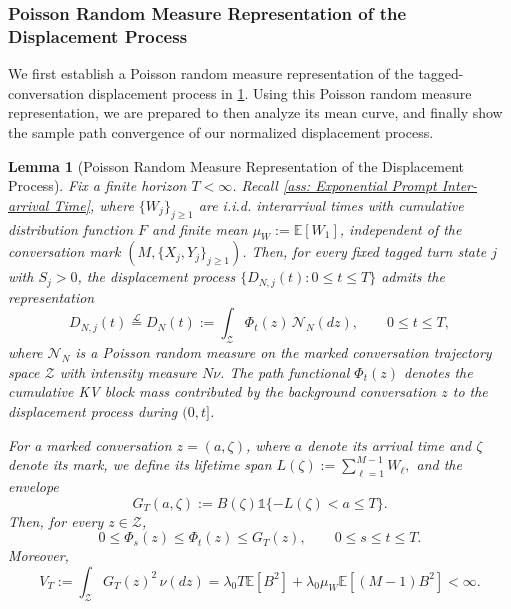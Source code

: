 \documentclass{article}
\newtheorem{lemma}[lemma]{Lemma}
\theoremstyle{definition}
\newcommand{\E}{\mathbb E}
\newcommand{\one}{\mathds{1}}
\begin{document}
\subsubsection{Poisson Random Measure Representation of the Displacement Process}
\label{sssec: Representation of the Displacement Process}

We first establish a Poisson random measure representation of the tagged-conversation displacement process in \cref{lem: Poisson Random Measure Representation}. Using this Poisson random measure representation, we are prepared to then analyze its mean curve, and finally show the sample path convergence of our normalized displacement process.

\begin{lemma}[Poisson Random Measure Representation of the Displacement Process]
\label{lem: Poisson Random Measure Representation}
    Fix a finite horizon $T<\infty$. Recall \cref{ass: Exponential Prompt Inter-arrival Time}, where $\{W_j\}_{j\geq1}$ are i.i.d. interarrival times with cumulative distribution function $F$ and finite mean $\mu_W:=\E[W_1]$, independent of the conversation mark $(M,\{X_j,Y_j\}_{j\geq1})$. Then, for every fixed tagged turn state $j$ with $S_j>0$, the displacement process $\{D_{N,j}(t):0\leq t\leq T\}$ admits the representation
    \begin{equation}
    \label{equ: Poisson Random Measure Representation}
        D_{N,j}(t)\stackrel{\mathcal L}{=}D_N(t):=\int_{\mathcal Z}\Phi_t(z)\,\mathcal N_N(dz), \qquad 0\leq t\leq T,
    \end{equation}
    where $\mathcal N_N$ is a Poisson random measure on the marked conversation trajectory space $\mathcal Z$ with intensity measure $N\nu$. The path functional $\Phi_t(z)$ denotes the cumulative KV block mass contributed by the background conversation $z$ to the displacement process during $(0,t]$.

    For a marked conversation $z=(a,\zeta)$, where $a$ denote its arrival time and $\zeta$ denote its mark, we define its lifetime span $L(\zeta):=\sum_{\ell=1}^{M-1}W_\ell,$ and the envelope
    \begin{equation*}
        G_T(a,\zeta):=B(\zeta)\one\{-L(\zeta)<a\leq T\}.
    \end{equation*}
    Then, for every $z\in\mathcal Z$,
    \begin{equation}
    \label{equ: PRM contribution bound}
        0\leq\Phi_s(z)\leq\Phi_t(z)\leq G_T(z), \qquad 0\leq s\leq t\leq T.
    \end{equation}
    Moreover,
    \begin{equation}
    \label{equ: PRM second moment constant}
        V_T:=\int_{\mathcal Z}G_T(z)^2\,\nu(dz)=\lambda_0T\E[B^2]+\lambda_0\mu_W\E[(M-1)B^2]<\infty.
    \end{equation}
\end{lemma}
\end{document}
